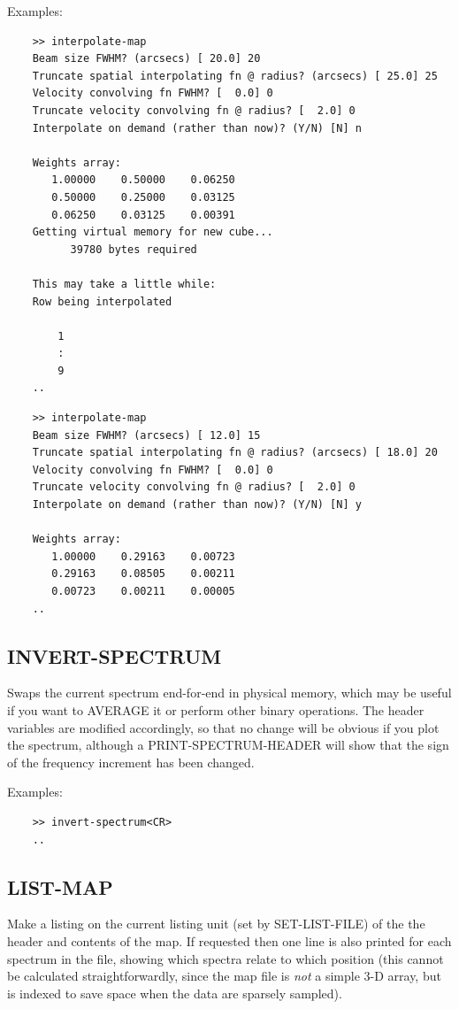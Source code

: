 \documentclass[11pt,twoside]{report}
\begin{document}
Examples:
\begin{verbatim}
    >> interpolate-map
    Beam size FWHM? (arcsecs) [ 20.0] 20
    Truncate spatial interpolating fn @ radius? (arcsecs) [ 25.0] 25
    Velocity convolving fn FWHM? [  0.0] 0
    Truncate velocity convolving fn @ radius? [  2.0] 0
    Interpolate on demand (rather than now)? (Y/N) [N] n

    Weights array:
       1.00000    0.50000    0.06250
       0.50000    0.25000    0.03125
       0.06250    0.03125    0.00391
    Getting virtual memory for new cube...
          39780 bytes required

    This may take a little while:
    Row being interpolated

        1
        :
        9
    ..
\end{verbatim}

\begin{verbatim}
    >> interpolate-map
    Beam size FWHM? (arcsecs) [ 12.0] 15
    Truncate spatial interpolating fn @ radius? (arcsecs) [ 18.0] 20
    Velocity convolving fn FWHM? [  0.0] 0
    Truncate velocity convolving fn @ radius? [  2.0] 0
    Interpolate on demand (rather than now)? (Y/N) [N] y

    Weights array:
       1.00000    0.29163    0.00723
       0.29163    0.08505    0.00211
       0.00723    0.00211    0.00005
    ..
\end{verbatim}

\subsection{INVERT-SPECTRUM} 

Swaps the current spectrum end-for-end in physical memory, which may be
useful if you want to AVERAGE it or perform other binary operations.
The header variables are modified accordingly, so that no change will be
obvious if you plot the spectrum, although a PRINT-SPECTRUM-HEADER will
show that the sign of the frequency increment has been changed.

Examples:
\begin{verbatim}
    >> invert-spectrum<CR>
    ..
\end{verbatim}

\subsection{LIST-MAP} 

Make a listing on the current listing unit (set by SET-LIST-FILE) of the
the header and contents of the map. If requested then one line is also printed
for each spectrum in the file, showing which spectra relate to which position
(this cannot be calculated straightforwardly, since the map file is {\em not}
a simple 3-D array, but is indexed to save space when the data are
sparsely sampled).
\end{document}

